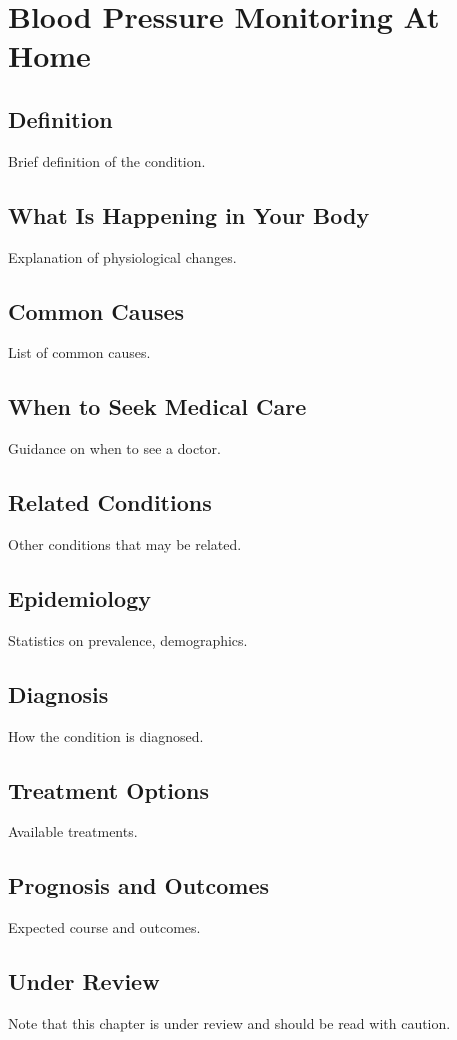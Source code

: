 \chapter{Blood Pressure Monitoring At Home}
\section*{Definition}
Brief definition of the condition.

\section*{What Is Happening in Your Body}
Explanation of physiological changes.

\section*{Common Causes}
List of common causes.

\section*{When to Seek Medical Care}
Guidance on when to see a doctor.

\section*{Related Conditions}
Other conditions that may be related.

\section*{Epidemiology}
Statistics on prevalence, demographics.

\section*{Diagnosis}
How the condition is diagnosed.

\section*{Treatment Options}
Available treatments.

\section*{Prognosis and Outcomes}
Expected course and outcomes.

\section*{Under Review}
Note that this chapter is under review and should be read with caution.
